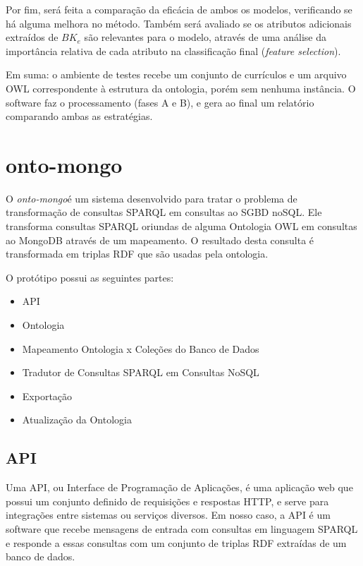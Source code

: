Por fim, será feita a comparação da eficácia de ambos os modelos, verificando se há alguma melhora no método. Também será avaliado se os atributos adicionais extraídos de $BK_e$ são relevantes para o modelo, através de uma análise da importância relativa de cada atributo na classificação final (\textit{feature selection}).

Em suma: o ambiente de testes recebe um conjunto de currículos e um arquivo OWL correspondente à estrutura da ontologia, porém sem nenhuma instância. O software faz o processamento (fases A e B), e gera ao final um relatório comparando ambas as estratégias.


\section{onto-mongo}
\label{sec:onto-mongo}

O \textit{onto-mongo}\footnotemark é um sistema desenvolvido para tratar o
problema de transformação de consultas SPARQL em consultas ao SGBD noSQL. Ele
transforma consultas SPARQL oriundas de alguma Ontologia OWL em consultas ao
MongoDB através de um mapeamento. O resultado desta consulta é transformada em
triplas RDF que são usadas pela ontologia.


O protótipo possui as seguintes partes:
\begin{itemize}
    \item API
    \item Ontologia %
    \item Mapeamento Ontologia x Coleções do Banco de Dados
    \item Tradutor de Consultas SPARQL em Consultas NoSQL
    \item Exportação
    \item Atualização da Ontologia %
\end{itemize}

\subsection{API}
Uma API, ou Interface de Programação de Aplicações, é uma aplicação web que
possui um conjunto definido de requisições e respostas HTTP, e serve para
integrações entre sistemas ou serviços diversos. Em nosso caso, a API é um
software que recebe mensagens de entrada com consultas em linguagem SPARQL e
responde a essas consultas com um conjunto de triplas RDF extraídas de um banco
de dados.

